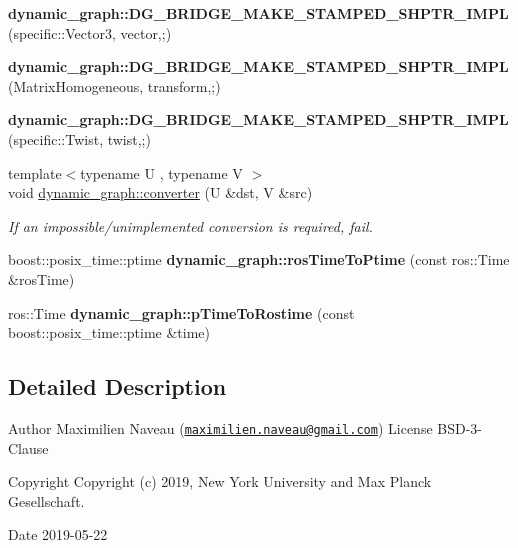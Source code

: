 \begin{DoxyCompactItemize}
\item 
{\bfseries dynamic\+\_\+graph\+::\+D\+G\+\_\+\+B\+R\+I\+D\+G\+E\+\_\+\+M\+A\+K\+E\+\_\+\+S\+T\+A\+M\+P\+E\+D\+\_\+\+S\+H\+P\+T\+R\+\_\+\+I\+M\+PL} (specific\+::\+Vector3, vector,;)\hypertarget{namespacedynamic__graph_a959196c1e676ca84b2e1b7c2dda8e982}{}\label{namespacedynamic__graph_a959196c1e676ca84b2e1b7c2dda8e982}

\item 
{\bfseries dynamic\+\_\+graph\+::\+D\+G\+\_\+\+B\+R\+I\+D\+G\+E\+\_\+\+M\+A\+K\+E\+\_\+\+S\+T\+A\+M\+P\+E\+D\+\_\+\+S\+H\+P\+T\+R\+\_\+\+I\+M\+PL} (Matrix\+Homogeneous, transform,;)\hypertarget{namespacedynamic__graph_a724ed2c3a6a902fc23526ffadc0b864a}{}\label{namespacedynamic__graph_a724ed2c3a6a902fc23526ffadc0b864a}

\item 
{\bfseries dynamic\+\_\+graph\+::\+D\+G\+\_\+\+B\+R\+I\+D\+G\+E\+\_\+\+M\+A\+K\+E\+\_\+\+S\+T\+A\+M\+P\+E\+D\+\_\+\+S\+H\+P\+T\+R\+\_\+\+I\+M\+PL} (specific\+::\+Twist, twist,;)\hypertarget{namespacedynamic__graph_a8b3e9c1129e4232f6db8ed3cb2a0496f}{}\label{namespacedynamic__graph_a8b3e9c1129e4232f6db8ed3cb2a0496f}

\item 
{\footnotesize template$<$typename U , typename V $>$ }\\void \hyperlink{namespacedynamic__graph_a38ff488b8b21c0b4f4d7f44572fa4ee5}{dynamic\+\_\+graph\+::converter} (U \&dst, V \&src)
\begin{DoxyCompactList}\small\item\em If an impossible/unimplemented conversion is required, fail. \end{DoxyCompactList}\item 
boost\+::posix\+\_\+time\+::ptime {\bfseries dynamic\+\_\+graph\+::ros\+Time\+To\+Ptime} (const ros\+::\+Time \&ros\+Time)\hypertarget{namespacedynamic__graph_ae79d27ce6f0c5bc0788a4fb4bd33f363}{}\label{namespacedynamic__graph_ae79d27ce6f0c5bc0788a4fb4bd33f363}

\item 
ros\+::\+Time {\bfseries dynamic\+\_\+graph\+::p\+Time\+To\+Rostime} (const boost\+::posix\+\_\+time\+::ptime \&time)\hypertarget{namespacedynamic__graph_a3d2b2b3f2e9363d80c0abb64c4408e66}{}\label{namespacedynamic__graph_a3d2b2b3f2e9363d80c0abb64c4408e66}

\end{DoxyCompactItemize}


\subsection{Detailed Description}
\begin{DoxyAuthor}{Author}
Maximilien Naveau (\href{mailto:maximilien.naveau@gmail.com}{\tt maximilien.\+naveau@gmail.\+com})  License B\+S\+D-\/3-\/\+Clause 
\end{DoxyAuthor}
\begin{DoxyCopyright}{Copyright}
Copyright (c) 2019, New York University and Max Planck Gesellschaft. 
\end{DoxyCopyright}
\begin{DoxyDate}{Date}
2019-\/05-\/22 
\end{DoxyDate}


